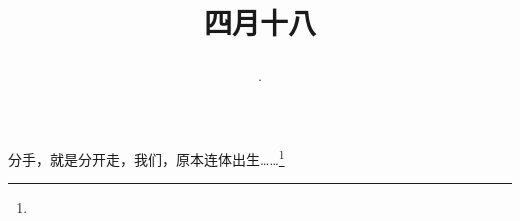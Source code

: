 \title{\date[d=25,m=5,y=2024][year:cn-y,年,month:cn,day:cn,日,·,weekday]·四月十八 }
分手，就是分开走，我们，原本连体出生……\footnote{ }


